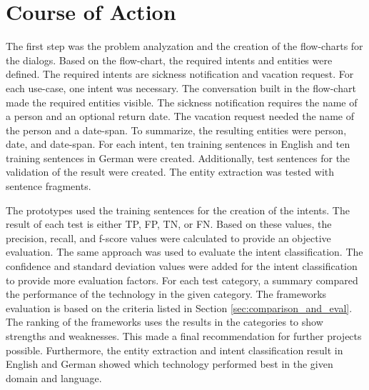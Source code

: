 \section{Course of Action} %
The first step was the problem analyzation and the creation of the flow-charts for the dialogs.
Based on the flow-chart, the required intents and entities were defined.
The required intents are sickness notification and vacation request.
For each use-case, one intent was necessary.
The conversation built in the flow-chart made the required entities visible.
The sickness notification requires the name of a person and an optional return date.
The vacation request needed the name of the person and a date-span.
To summarize, the resulting entities were person, date, and date-span.
For each intent, ten training sentences in English and ten training sentences in German were created.
Additionally, test sentences for the validation of the result were created.
The entity extraction was tested with sentence fragments.

The prototypes used the training sentences for the creation of the intents.
The result of each test is either TP, FP, TN, or FN.
Based on these values, the precision, recall, and f-score values were calculated to provide an objective evaluation.
The same approach was used to evaluate the intent classification.
The confidence and standard deviation values were added for the intent classification to provide more evaluation factors.
For each test category, a summary compared the performance of the technology in the given category.
The frameworks evaluation is based on the criteria listed in Section \ref{sec:comparison_and_eval}.
The ranking of the frameworks uses the results in the categories to show strengths and weaknesses.
This made a final recommendation for further projects possible.
Furthermore, the entity extraction and intent classification result in English and German showed which technology performed best in the given domain and language.